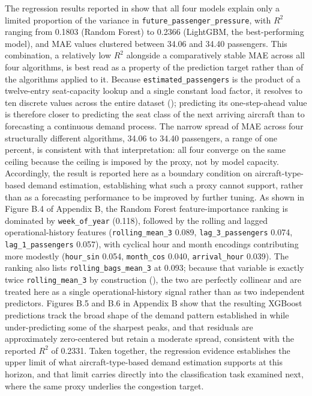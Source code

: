 The regression results reported in  show that all four models explain only a limited proportion of the variance in \nolinkurl{future_passenger_pressure}, with $R^2$ ranging from 0.1803 (Random Forest) to 0.2366 (LightGBM, the best-performing model), and MAE values clustered between 34.06 and 34.40 passengers. This combination, a relatively low $R^2$ alongside a comparatively stable MAE across all four algorithms, is best read as a property of the prediction target rather than of the algorithms applied to it. Because \nolinkurl{estimated_passengers} is the product of a twelve-entry seat-capacity lookup and a single constant load factor, it resolves to ten discrete values across the entire dataset (); predicting its one-step-ahead value is therefore closer to predicting the seat class of the next arriving aircraft than to forecasting a continuous demand process. The narrow spread of MAE across four structurally different algorithms, 34.06 to 34.40 passengers, a range of one percent, is consistent with that interpretation: all four converge on the same ceiling because the ceiling is imposed by the proxy, not by model capacity. Accordingly, the result is reported here as a boundary condition on aircraft-type-based demand estimation, establishing what such a proxy cannot support, rather than as a forecasting performance to be improved by further tuning. As shown in Figure B.4 of Appendix B, the Random Forest feature-importance ranking is dominated by \nolinkurl{week_of_year} (0.118), followed by the rolling and lagged operational-history features (\nolinkurl{rolling_mean_3} 0.089, \nolinkurl{lag_3_passengers} 0.074, \nolinkurl{lag_1_passengers} 0.057), with cyclical hour and month encodings contributing more modestly (\nolinkurl{hour_sin} 0.054, \nolinkurl{month_cos} 0.040, \nolinkurl{arrival_hour} 0.039). The ranking also lists \nolinkurl{rolling_bags_mean_3} at 0.093; because that variable is exactly twice \nolinkurl{rolling_mean_3} by construction (), the two are perfectly collinear and are treated here as a single operational-history signal rather than as two independent predictors. Figures B.5 and B.6 in Appendix B show that the resulting XGBoost predictions track the broad shape of the demand pattern established in  while under-predicting some of the sharpest peaks, and that residuals are approximately zero-centered but retain a moderate spread, consistent with the reported $R^2$ of 0.2331. Taken together, the regression evidence establishes the upper limit of what aircraft-type-based demand estimation supports at this horizon, and that limit carries directly into the classification task examined next, where the same proxy underlies the congestion target.

